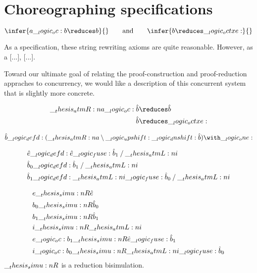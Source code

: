 \section{Choreographing specifications}

\begin{equation*}
  \infer{a \oc b \reduces b}{}
  \qquad\text{and}\qquad
  \infer{b \reduces \octxe}{}
\end{equation*}

As a specification, these string rewriting axioms are quite reasonable.
However, as a [...], [...].

Toward our ultimate goal of relating the proof-construction and proof-reduction appraches to concurrency, we would like a description of this concurrent system that is slightly more concrete.

\begin{align*}
  \atmR{a} \oc \hat{b} &\reduces \hat{b} \\
  \hat{b} &\reduces \octxe
\end{align*}

\begin{equation*}
  \hat{b} \defd (\atmR{a} \limp \up \dn \hat{b}) \with \one
\end{equation*}



\begin{equation*}
  \begin{lgathered}
    \bin{e} \defd \bin{e} \fuse \bin{b}_1 \pmir \atmL{i} \\
    \bin{b}_0 \defd \bin{b}_1 \pmir \atmL{i} \\
    \bin{b}_1 \defd \atmL{i} \fuse \bin{b}_0 \pmir \atmL{i}
  \end{lgathered}
\end{equation*}

\begin{equation*}
  \begin{lgathered}
    e \simu{R} \bin{e} \\
    b_0 \simu{R} \bin{b}_0 \\
    b_1 \simu{R} \bin{b}_1 \\
    i \simu{R} \atmL{i} \\
    e \oc b_1 \simu{R} \bin{e} \fuse \bin{b}_1 \\
    i \oc b_0 \simu{R} \atmL{i} \fuse \bin{b}_0
  \end{lgathered}
\end{equation*}
$\__thesis_simu:n {R}$ is a reduction bisimulation.

